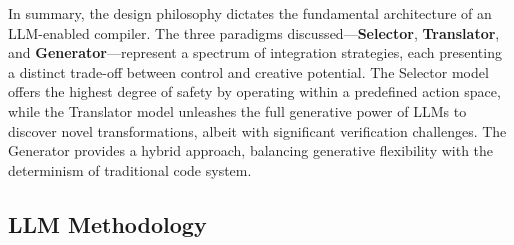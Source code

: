 \documentclass[pdflatex,sn-mathphys-ay,twocolumn, a4paper]{sn-jnl}%
\theoremstyle{thmstyleone}%
\theoremstyle{thmstyletwo}%
\theoremstyle{thmstylethree}%
\begin{document}
In summary, the design philosophy dictates the fundamental architecture of an LLM-enabled compiler. The three paradigms discussed—\textbf{Selector}, \textbf{Translator}, and \textbf{Generator}—represent a spectrum of integration strategies, each presenting a distinct trade-off between control and creative potential. The Selector model offers the highest degree of safety by operating within a predefined action space, while the Translator model unleashes the full generative power of LLMs to discover novel transformations, albeit with significant verification challenges. The Generator provides a hybrid approach, balancing generative flexibility with the determinism of traditional code system.

\subsection{LLM Methodology}
\label{llm_methodology}
\end{document}
